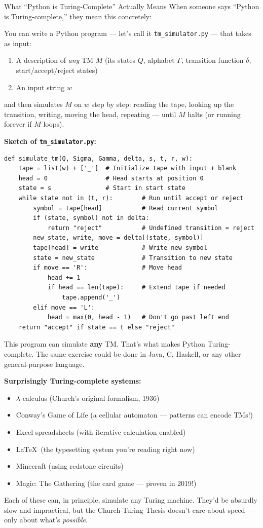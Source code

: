 \begin{examplebox}{What ``Python is Turing-Complete'' Actually Means}
When someone says ``Python is Turing-complete,'' they mean this concretely:

You can write a Python program --- let's call it \texttt{tm\_simulator.py} ---
that takes as input:
\begin{enumerate}[nosep]
\item A description of \emph{any} TM $M$ (its states $Q$, alphabet $\Gamma$,
  transition function $\delta$, start/accept/reject states)
\item An input string $w$
\end{enumerate}
and then simulates $M$ on $w$ step by step: reading the tape, looking up the
transition, writing, moving the head, repeating --- until $M$ halts (or running
forever if $M$ loops).

\textbf{Sketch of \texttt{tm\_simulator.py}:}
\begin{lstlisting}
def simulate_tm(Q, Sigma, Gamma, delta, s, t, r, w):
    tape = list(w) + ['_']  # Initialize tape with input + blank
    head = 0                # Head starts at position 0
    state = s               # Start in start state
    while state not in (t, r):        # Run until accept or reject
        symbol = tape[head]           # Read current symbol
        if (state, symbol) not in delta:
            return "reject"           # Undefined transition = reject
        new_state, write, move = delta[(state, symbol)]
        tape[head] = write            # Write new symbol
        state = new_state             # Transition to new state
        if move == 'R':               # Move head
            head += 1
            if head == len(tape):     # Extend tape if needed
                tape.append('_')
        elif move == 'L':
            head = max(0, head - 1)   # Don't go past left end
    return "accept" if state == t else "reject"
\end{lstlisting}

This program can simulate \textbf{any} TM. That's what makes Python
Turing-complete. The same exercise could be done in Java, C, Haskell, or
any other general-purpose language.

\textbf{Surprisingly Turing-complete systems:}
\begin{itemize}[nosep]
\item $\lambda$-calculus (Church's original formalism, 1936)
\item Conway's Game of Life (a cellular automaton --- patterns can encode TMs!)
\item Excel spreadsheets (with iterative calculation enabled)
\item \LaTeX\ (the typesetting system you're reading right now)
\item Minecraft (using redstone circuits)
\item Magic: The Gathering (the card game --- proven in 2019!)
\end{itemize}

Each of these can, in principle, simulate any Turing machine. They'd be
absurdly slow and impractical, but the Church-Turing Thesis doesn't care about
speed --- only about what's \emph{possible}.
\end{examplebox}

